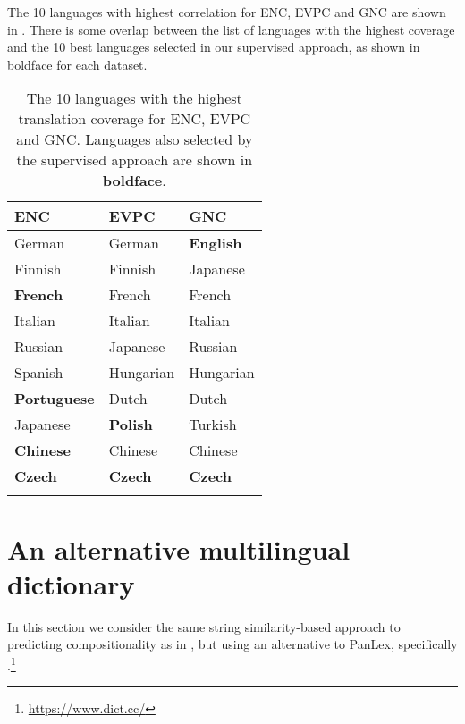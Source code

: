 \documentclass[output=paper,modfonts,nonflat]{langsci/langscibook}
\begin{document}
The 10 languages with highest correlation for ENC, EVPC and GNC are
shown in . There is some overlap between the
list of languages with the highest coverage and the 10 best languages
selected in our supervised approach, as shown in boldface for each
dataset.


\begin{table}[t]

\begin{tabularx}{.8\textwidth}{XXX } \lsptoprule

ENC&EVPC&GNC\\
\midrule
German & German & \textbf{English}\\
Finnish  & Finnish & Japanese\\
\textbf{French}& French & French\\
Italian& Italian & Italian\\
Russian&  Japanese & Russian\\
Spanish & Hungarian & Hungarian\\
\textbf{Portuguese} & Dutch & Dutch\\
Japanese& \textbf{Polish}&  Turkish\\
\textbf{Chinese} & Chinese & Chinese\\
\textbf{Czech}&  \textbf{Czech} &\textbf{Czech}\\
\lspbottomrule

\end{tabularx}


\caption{\label{tab:ss:cov} The 10 languages with the highest
  translation coverage for ENC, EVPC and GNC. Languages also selected
  by the supervised approach are shown in \textbf{boldface}.}
\end{table}




\section{An alternative multilingual dictionary\label{sec:dictcc}}
\largerpage[2]
In this section we consider the same string similarity-based approach
to predicting compositionality as in , but
using an alternative  to PanLex, specifically
\dictcc.\footnote{\url{https://www.dict.cc/}}

\end{document}
